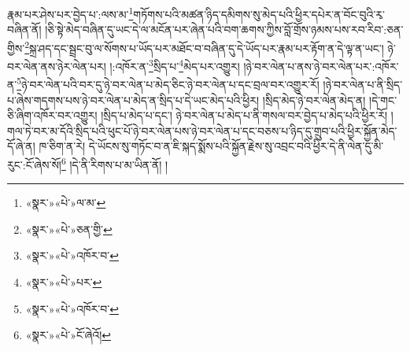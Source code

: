 རྣམ་པར་ཤེས་པར་བྱེད་པ་:ལས་མ་\footnote{«སྣར་»«པེ་»ལ་མ་}གཏོགས་པའི་མཚན་ཉིད་དམིགས་སུ་མེད་པའི་ཕྱིར་དཔེར་ན་བོང་བུའི་རྭ་བཞིན་ནོ། །ཅི་སྟེ་མེད་བཞིན་དུ་ཡང་དེ་ལ་མངོན་པར་ཞེན་པའི་བག་ཆགས་ཀྱིས་བློ་གྲོས་ཉམས་པས་རབ་རིབ་:ཅན་གྱིས་\footnote{«སྣར་»«པེ་»ཅན་གྱི་}སྐྲ་ཤད་དང་སྦྲང་བུ་ལ་སོགས་པ་ཡོད་པར་མཐོང་བ་བཞིན་དུ་དེ་ཡོད་པར་རྣམ་པར་རྟོག་ན་དེ་ལྟ་ན་ཡང་། ཉེ་བར་ལེན་ནས་ཉེར་ལེན་པར། །:འཁོར་ན་\footnote{«སྣར་»«པེ་»འཁོར་བ་}སྲིད་པ་\footnote{«སྣར་»«པེ་»པར་}མེད་པར་འགྱུར། །ཉེ་བར་ལེན་པ་ནས་ཉེ་བར་ལེན་པར་:འཁོར་ན་\footnote{«སྣར་»«པེ་»འཁོར་བ་}ཉེ་བར་ལེན་པའི་བར་དུ་ཉེ་བར་ལེན་པ་མེད་ཅིང་ཉེ་བར་ལེན་པ་དང་བྲལ་བར་འགྱུར་རོ། །ཉེ་བར་ལེན་པ་ནི་སྲིད་པ་ཞེས་གདགས་པས་ཉེ་བར་ལེན་པ་མེད་ན་སྲིད་པ་དེ་ཡང་མེད་པའི་ཕྱིར། །སྲིད་མེད་ཉེ་བར་ལེན་མེད་ན། །དེ་གང་ཅི་ཞིག་འཁོར་བར་འགྱུར། །སྲིད་པ་མེད་པ་དང་། ཉེ་བར་ལེན་པ་མེད་པ་ནི་གསལ་བར་བྱེད་པ་མེད་པའི་ཕྱིར་རོ། །གལ་ཏེ་བར་མ་དོའི་སྲིད་པའི་ཕུང་པོ་ཉེ་བར་ལེན་པས་ཉེ་བར་ལེན་པ་དང་བཅས་པ་ཉིད་དུ་གྲུབ་པའི་ཕྱིར་སྐྱོན་མེད་དོ་ཞེ་ན། ཁ་ཅིག་ན་རེ། དེ་ཡོངས་སུ་གཏོང་བ་ན་ཇི་སྐད་སྨོས་པའི་སྐྱོན་རྗེས་སུ་འབྲང་བའི་ཕྱིར་དེ་ནི་ལེན་དུ་མི་རུང་:ངོ་ཞེས་སོ།\footnote{«སྣར་»«པེ་»ངོ་ཞེའོ།} །དེ་ནི་རིགས་པ་མ་ཡིན་ནོ། །
